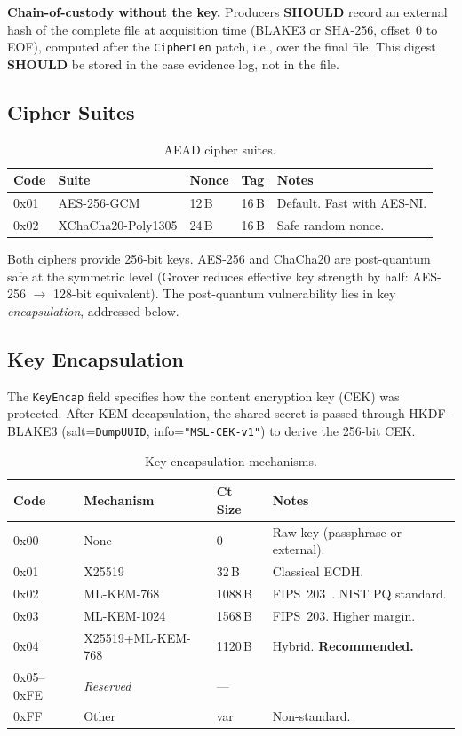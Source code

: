 \documentclass[11pt,a4paper]{article}
\newcommand{\SHOULD}{\textbf{SHOULD}}
\newcommand{\field}[1]{\texttt{#1}}
\newcommand{\blake}{BLAKE3}
\begin{document}
\noindent\textbf{Chain-of-custody without the key.} Producers \SHOULD{} record an external hash of the complete file at acquisition time (\blake{} or SHA-256, offset~0 to EOF), computed after the \field{CipherLen} patch, i.e., over the final file. This digest \SHOULD{} be stored in the case evidence log, not in the file.

\subsection{Cipher Suites}
\begin{table}[H]\centering\caption{AEAD cipher suites.}\label{tab:ciphers}\small
\begin{tabular}{M l l l p{3.5cm}}\toprule\textbf{Code}&\textbf{Suite}&\textbf{Nonce}&\textbf{Tag}&\textbf{Notes}\\\midrule
0x01 & AES-256-GCM & 12\,B & 16\,B & Default. Fast with AES-NI. \\
0x02 & XChaCha20-Poly1305 & 24\,B & 16\,B & Safe random nonce. \\\bottomrule
\end{tabular}\end{table}

\noindent Both ciphers provide 256-bit keys. AES-256 and ChaCha20 are post-quantum safe at the symmetric level (Grover reduces effective key strength by half: AES-256 $\to$ 128-bit equivalent). The post-quantum vulnerability lies in key \emph{encapsulation}, addressed below.

\subsection{Key Encapsulation}\label{sec:kem}
The \field{KeyEncap} field specifies how the content encryption key (CEK) was protected. After KEM decapsulation, the shared secret is passed through HKDF-\blake{} (salt=\field{DumpUUID}, info=\texttt{"MSL-CEK-v1"}) to derive the 256-bit CEK.

\begin{table}[H]\centering\caption{Key encapsulation mechanisms.}\label{tab:kem}\small
\begin{tabular}{M l l p{4.5cm}}\toprule\textbf{Code}&\textbf{Mechanism}&\textbf{Ct Size}&\textbf{Notes}\\\midrule
0x00 & None & 0 & Raw key (passphrase or external). \\
0x01 & X25519 & 32\,B & Classical ECDH. \\
0x02 & ML-KEM-768 & 1088\,B & FIPS~203~\cite{mlkem}. NIST PQ standard. \\
0x03 & ML-KEM-1024 & 1568\,B & FIPS~203. Higher margin. \\
0x04 & X25519+ML-KEM-768 & 1120\,B & Hybrid. \textbf{Recommended.} \\
0x05--0xFE & \textit{Reserved} & --- & \\
0xFF & Other & var & Non-standard. \\\bottomrule
\end{tabular}\end{table}
\end{document}
